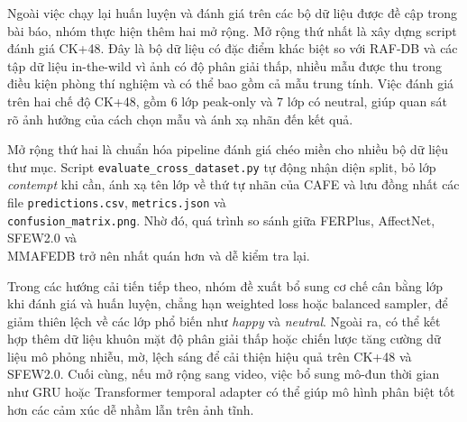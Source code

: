Ngoài việc chạy lại huấn luyện và đánh giá trên các bộ dữ liệu được đề cập trong bài báo, nhóm thực hiện thêm hai mở rộng. Mở rộng thứ nhất là xây dựng script đánh giá CK+48. Đây là bộ dữ liệu có đặc điểm khác biệt so với RAF-DB và các tập dữ liệu in-the-wild vì ảnh có độ phân giải thấp, nhiều mẫu được thu trong điều kiện phòng thí nghiệm và có thể bao gồm cả mẫu trung tính. Việc đánh giá trên hai chế độ CK+48, gồm 6 lớp peak-only và 7 lớp có neutral, giúp quan sát rõ ảnh hưởng của cách chọn mẫu và ánh xạ nhãn đến kết quả.

Mở rộng thứ hai là chuẩn hóa pipeline đánh giá chéo miền cho nhiều bộ dữ liệu thư mục. Script \texttt{evaluate\_cross\_dataset.py} tự động nhận diện split, bỏ lớp \textit{contempt} khi cần, ánh xạ tên lớp về thứ tự nhãn của CAFE và lưu đồng nhất các file \texttt{predictions.csv}, \texttt{metrics.json} và \\ \texttt{confusion\_matrix.png}. Nhờ đó, quá trình so sánh giữa FERPlus, AffectNet, SFEW2.0 và \\ MMAFEDB trở nên nhất quán hơn và dễ kiểm tra lại.

Trong các hướng cải tiến tiếp theo, nhóm đề xuất bổ sung cơ chế cân bằng lớp khi đánh giá và huấn luyện, chẳng hạn weighted loss hoặc balanced sampler, để giảm thiên lệch về các lớp phổ biến như \textit{happy} và \textit{neutral}. Ngoài ra, có thể kết hợp thêm dữ liệu khuôn mặt độ phân giải thấp hoặc chiến lược tăng cường dữ liệu mô phỏng nhiễu, mờ, lệch sáng để cải thiện hiệu quả trên CK+48 và SFEW2.0. Cuối cùng, nếu mở rộng sang video, việc bổ sung mô-đun thời gian như GRU hoặc Transformer temporal adapter có thể giúp mô hình phân biệt tốt hơn các cảm xúc dễ nhầm lẫn trên ảnh tĩnh.
